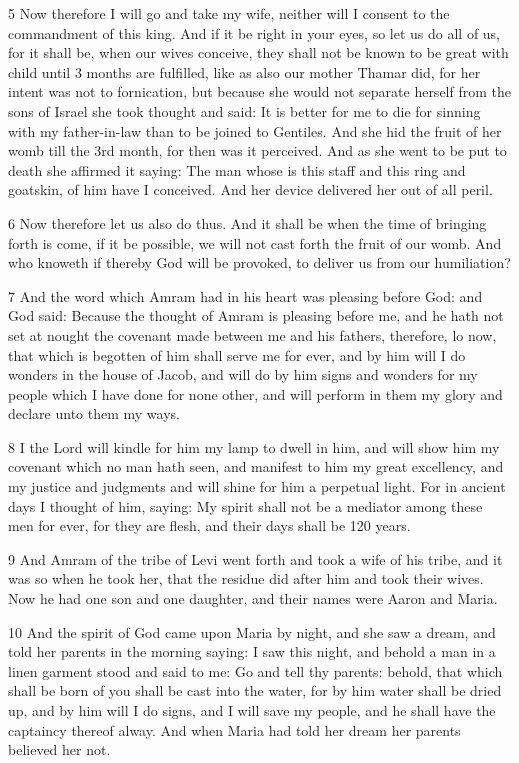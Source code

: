 \par 5 Now therefore I will go and take my wife, neither will I consent to the commandment of this king. And if it be right in your eyes, so let us do all of us, for it shall be, when our wives conceive, they shall not be known to be great with child until 3 months are fulfilled, like as also our mother Thamar did, for her intent was not to fornication, but because she would not separate herself from the sons of Israel she took thought and said: It is better for me to die for sinning with my father-in-law than to be joined to Gentiles. And she hid the fruit of her womb till the 3rd month, for then was it perceived. And as she went to be put to death she affirmed it saying: The man whose is this staff and this ring and goatskin, of him have I conceived. And her device delivered her out of all peril. 

\par 6 Now therefore let us also do thus. And it shall be when the time of bringing forth is come, if it be possible, we will not cast forth the fruit of our womb. And who knoweth if thereby God will be provoked, to deliver us from our humiliation?

\par 7 And the word which Amram had in his heart was pleasing before God: and God said: Because the thought of Amram is pleasing before me, and he hath not set at nought the covenant made between me and his fathers, therefore, lo now, that which is begotten of him shall serve me for ever, and by him will I do wonders in the house of Jacob, and will do by him signs and wonders for my people which I have done for none other, and will perform in them my glory and declare unto them my ways. 

\par 8 I the Lord will kindle for him my lamp to dwell in him, and will show him my covenant which no man hath seen, and manifest to him my great excellency, and my justice and judgments and will shine for him a perpetual light. For in ancient days I thought of him, saying: My spirit shall not be a mediator among these men for ever, for they are flesh, and their days shall be 120 years.

\par 9 And Amram of the tribe of Levi went forth and took a wife of his tribe, and it was so when he took her, that the residue did after him and took their wives. Now he had one son and one daughter, and their names were Aaron and Maria.

\par 10 And the spirit of God came upon Maria by night, and she saw a dream, and told her parents in the morning saying: I saw this night, and behold a man in a linen garment stood and said to me: Go and tell thy parents: behold, that which shall be born of you shall be cast into the water, for by him water shall be dried up, and by him will I do signs, and I will save my people, and he shall have the captaincy thereof alway. And when Maria had told her dream her parents believed her not.

